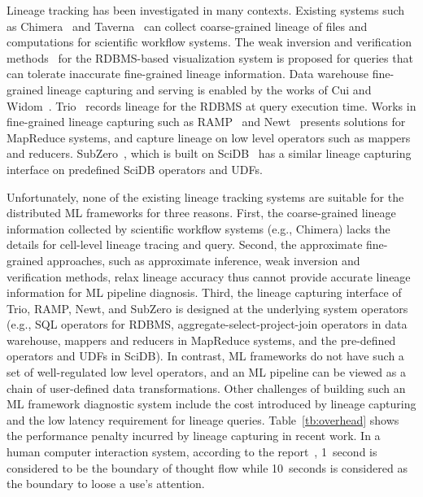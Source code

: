 \documentclass{sig-alternate}
\begin{document}
Lineage tracking has been investigated in many contexts.
Existing systems such as Chimera~\cite{foster02} and Taverna~\cite{oinn02} can collect coarse-grained lineage 
of files and computations for scientific workflow systems.
The weak inversion and verification methods~\cite{woodruff97} for the RDBMS-based visualization system 
is proposed for queries that can tolerate inaccurate fine-grained lineage information.
Data warehouse fine-grained lineage capturing and serving is enabled by the works of Cui and Widom~\cite{cui00, cui03}.
Trio~\cite{widom04} records lineage for the RDBMS at query execution time.
Works in fine-grained lineage capturing such as RAMP~\cite{ikeda11, park11} and Newt~\cite{logothetis13} presents
solutions for MapReduce systems, and capture lineage on low level operators such as mappers and reducers.
SubZero~\cite{wu13}, which is built on SciDB~\cite{brown10} has a similar lineage capturing interface on predefined SciDB operators and UDFs.

Unfortunately, none of the existing lineage tracking systems are suitable for the distributed ML frameworks for three reasons.
First, the coarse-grained lineage information collected by scientific workflow systems (e.g., Chimera) lacks the details for cell-level lineage tracing and query.
Second, the approximate fine-grained approaches, such as approximate inference, weak inversion and verification methods, 
relax lineage accuracy thus cannot provide accurate lineage information for ML pipeline diagnosis.
Third, the lineage capturing interface of Trio, RAMP, Newt, and SubZero is designed at
the underlying system operators (e.g., SQL operators for RDBMS, aggregate-select-project-join operators in data warehouse, 
mappers and reducers in MapReduce systems, and the pre-defined operators and UDFs in SciDB). 
In contrast, ML frameworks do not have such a set of well-regulated low level operators,
and an ML pipeline can be viewed as a chain of user-defined data transformations.
Other challenges of building such an ML framework diagnostic system include the cost introduced by 
lineage capturing and the low latency requirement for lineage queries.
Table~\ref{tb:overhead} shows the performance penalty incurred by lineage capturing in recent work.
In a human computer interaction system, according to the report~\cite{nielsen2009}, 
1~second is considered to be the boundary of thought flow while 
10~seconds is considered as the boundary to loose a use's attention.
\end{document}
